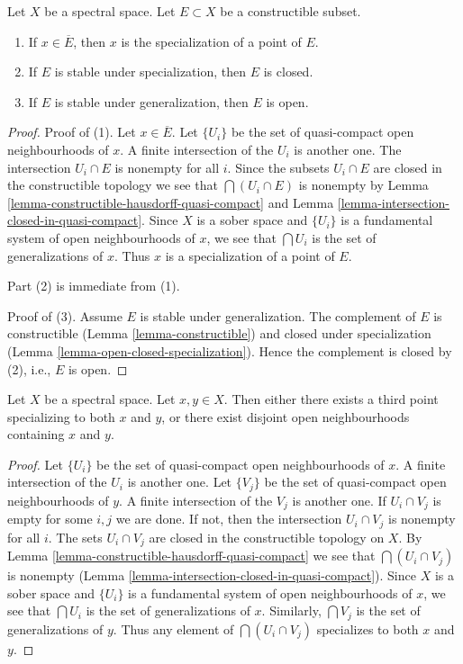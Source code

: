 \begin{lemma}
\label{lemma-constructible-stable-specialization-closed}
Let $X$ be a spectral space. Let $E \subset X$ be a constructible subset.
\begin{enumerate}
\item If $x \in \overline{E}$, then $x$ is the specialization of a point of
$E$.
\item If $E$ is stable under specialization, then $E$ is closed.
\item If $E$ is stable under generalization, then $E$ is open.
\end{enumerate}
\end{lemma}

\begin{proof}
Proof of (1). Let $x \in \overline{E}$. Let $\{U_i\}$ be the set of
quasi-compact open neighbourhoods of $x$. A finite intersection of the
$U_i$ is another one. The intersection $U_i \cap E$ is nonempty for all
$i$. Since the subsets $U_i \cap E$ are closed in the constructible topology
we see that $\bigcap (U_i \cap E)$ is nonempty by
Lemma \ref{lemma-constructible-hausdorff-quasi-compact} and
Lemma \ref{lemma-intersection-closed-in-quasi-compact}.
Since $X$ is a sober space and $\{U_i\}$ is a
fundamental system of open neighbourhoods of $x$, we see that
$\bigcap U_i$ is the set of generalizations of $x$. Thus
$x$ is a specialization of a point of $E$.

\medskip\noindent
Part (2) is immediate from (1).

\medskip\noindent
Proof of (3). Assume $E$ is stable under generalization.
The complement of $E$ is constructible (Lemma \ref{lemma-constructible})
and closed under specialization
(Lemma \ref{lemma-open-closed-specialization}).
Hence the complement is closed by (2), i.e., $E$ is open.
\end{proof}

\begin{lemma}
\label{lemma-two-points}
Let $X$ be a spectral space. Let $x, y \in X$. Then either there exists
a third point specializing to both $x$ and $y$, or there exist disjoint
open neighbourhoods containing $x$ and $y$.
\end{lemma}

\begin{proof}
Let $\{U_i\}$ be the set of quasi-compact open neighbourhoods of $x$.
A finite intersection of the $U_i$ is another one.
Let $\{V_j\}$ be the set of quasi-compact open neighbourhoods of $y$.
A finite intersection of the $V_j$ is another one.
If $U_i \cap V_j$ is empty for some $i, j$ we are done.
If not, then the intersection $U_i \cap V_j$ is nonempty
for all $i$. The sets $U_i \cap V_j$ are closed in the constructible
topology on $X$. By
Lemma \ref{lemma-constructible-hausdorff-quasi-compact}
we see that $\bigcap (U_i \cap V_j)$ is nonempty
(Lemma \ref{lemma-intersection-closed-in-quasi-compact}).
Since $X$ is a sober space and $\{U_i\}$ is a
fundamental system of open neighbourhoods of $x$, we see that
$\bigcap U_i$ is the set of generalizations of $x$.
Similarly, $\bigcap V_j$ is the set of generalizations of $y$.
Thus any element of $\bigcap (U_i \cap V_j)$ specializes to both
$x$ and $y$.
\end{proof}

